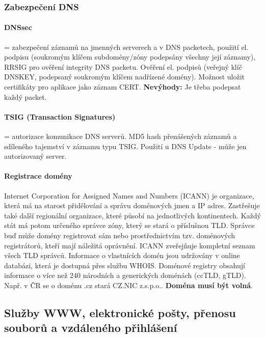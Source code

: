 \documentclass[10pt,a4paper]{article}
\begin{document}
\subsubsection{Zabezpečení DNS}
\paragraph{DNSsec} = zabezpečení záznamů na jmenných serverech a v DNS packetech, použití el. podpisu (soukromým klíčem subdomény/zóny podepsány všechny její záznamy), RRSIG pro ověření integrity DNS packetu. Ověření el. podpisů (veřejný klíč DNSKEY, podepsaný soukromým klíčem nadřízené domény). Možnost uložit certifikáty pro aplikace jako záznam CERT. \textbf{Nevýhody:} Je třeba podepsat každý packet.
\paragraph{TSIG (Transaction Signatures)} = autorizace komunikace DNS serverů. MD5 hash přenášených záznamů a sdíleného tajemství v záznamu typu TSIG. Použití u DNS Update - může jen autorizovaný server.
\paragraph{Registrace domény}
Internet Corporation for Assigned Names and Numbers (ICANN) je organizace, která má na starost přidělování a správu doménových jmen a IP adres. Zastřešuje také další regionální organizace, které působí na jednotlivých kontinentech. Každý stát má potom určeného správce zóny, který se stará o příslušnou TLD. Správce buď může domény registrovat sám nebo prostřednictvím tzv. doménových registrátorů, kteří mají náležitá oprávnění. ICANN zveřejňuje kompletní seznam všech TLD správců. Informace o vlastnících domén jsou udržovány v online databázi, která je dostupná přes službu WHOIS. Doménové registry obsahují informace o více než 240 národních a generických doménách (ccTLD, gTLD). Např. v ČR se o doménu .cz stará CZ.NIC z.s.p.o.. \textbf{Doména musí být volná}.




\subsection{Služby WWW, elektronické pošty, přenosu souborů a vzdáleného přihlášení}
\end{document}
